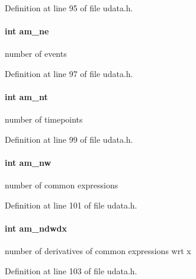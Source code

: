 Definition at line 95 of file udata.\+h.

\hypertarget{struct_user_data_a1ee2e63bd2b30c7196b4984014fbc3a4}{}
\paragraph[{am\+\_\+ne}]{\setlength{\rightskip}{0pt plus 5cm}int am\+\_\+ne}\label{struct_user_data_a1ee2e63bd2b30c7196b4984014fbc3a4}
number of events 

Definition at line 97 of file udata.\+h.

\hypertarget{struct_user_data_a08ea6ecb241cd86a6f171761a48e27dd}{}
\paragraph[{am\+\_\+nt}]{\setlength{\rightskip}{0pt plus 5cm}int am\+\_\+nt}\label{struct_user_data_a08ea6ecb241cd86a6f171761a48e27dd}
number of timepoints 

Definition at line 99 of file udata.\+h.

\hypertarget{struct_user_data_abafd93498a922dbe7a03af57f45fcee9}{}
\paragraph[{am\+\_\+nw}]{\setlength{\rightskip}{0pt plus 5cm}int am\+\_\+nw}\label{struct_user_data_abafd93498a922dbe7a03af57f45fcee9}
number of common expressions 

Definition at line 101 of file udata.\+h.

\hypertarget{struct_user_data_a0723cf4e6ad49bf9d0eb18de66fdcd07}{}
\paragraph[{am\+\_\+ndwdx}]{\setlength{\rightskip}{0pt plus 5cm}int am\+\_\+ndwdx}\label{struct_user_data_a0723cf4e6ad49bf9d0eb18de66fdcd07}
number of derivatives of common expressions wrt x 

Definition at line 103 of file udata.\+h.


